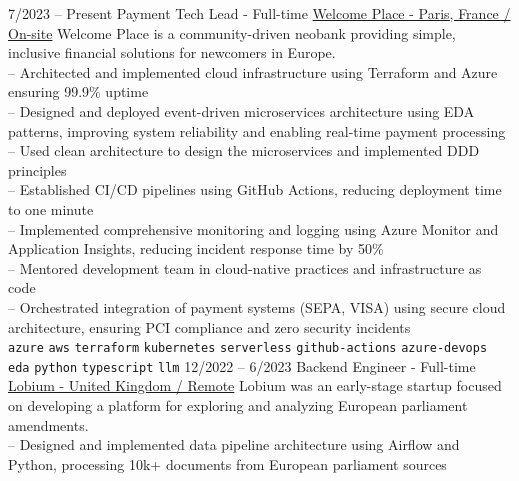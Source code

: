 \vspace{0.2cm}


\begin{entrylist}
    \entry
    {7/2023 -- Present}
    {Payment Tech Lead - Full-time}
    {
        \href{https://www.linkedin.com/company/welcome-place/}{Welcome Place - Paris, France / On-site}}
    {
        Welcome Place is a community-driven neobank providing simple, inclusive financial solutions for newcomers in Europe. \\

        -- Architected and implemented cloud infrastructure using Terraform and Azure ensuring 99.9\% uptime \\
        -- Designed and deployed event-driven microservices architecture using EDA patterns, improving system reliability and enabling real-time payment processing \\
        -- Used clean architecture to design the microservices and implemented DDD principles \\
        -- Established CI/CD pipelines using GitHub Actions, reducing deployment time to one minute \\
        -- Implemented comprehensive monitoring and logging using Azure Monitor and Application Insights, reducing incident response time by 50\% \\
        -- Mentored development team in cloud-native practices and infrastructure as code \\
        -- Orchestrated integration of payment systems (SEPA, VISA) using secure cloud architecture, ensuring PCI compliance and zero security incidents \\
        \texttt{azure}\slashsep
        \texttt{aws}\slashsep
        \texttt{terraform}\slashsep
        \texttt{kubernetes}\slashsep
        \texttt{serverless}\slashsep
        \texttt{github-actions}\slashsep
        \texttt{azure-devops}\slashsep
        \texttt{eda}\slashsep
        \texttt{python}\slashsep
        \texttt{typescript}\slashsep
        \texttt{llm}\slashsep
    }
    \entry
    {12/2022 -- 6/2023}
    {Backend Engineer - Full-time}
    {
        \href{https://www.linkedin.com/company/lobium/}{Lobium - United Kingdom / Remote}}
    {
        Lobium was an early-stage startup focused on developing a platform for exploring and analyzing European parliament amendments. \\
        -- Designed and implemented data pipeline architecture using Airflow and Python, processing 10k+ documents from European parliament sources \\
}
\end{entrylist}
